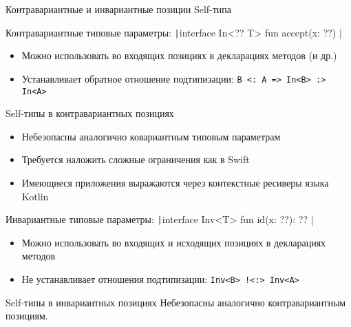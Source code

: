 \documentclass[handout,aspectratio=169,usenames,dvipsnames]{beamer}
\begin{document}
    \begin{frame}{Контравариантные и инвариантные позиции Self-типа}
        \begin{block}{Контравариантные типовые параметры: \texttt|interface In<?? T> { fun accept(x: ??) }|}
            \begin{itemize}
                \item Можно использовать во входящих позициях в декларациях методов (и др.)
                \item Устанавливает обратное отношение подтипизации: \texttt{B <: A => In<B> :> In<A>}
            \end{itemize}
        \end{block}
        \pause
        \begin{block}{Self-типы в контравариантных позициях}
            \begin{itemize}
                \item Небезопасны аналогично ковариантным типовым параметрам
                \item Требуется наложить сложные ограничения как в Swift
                \item Имеющиеся приложения выражаются через контекстные ресиверы языка Kotlin
            \end{itemize}
        \end{block}
        \pause
        \begin{block}{Инвариантные типовые параметры: \texttt|interface Inv<T> { fun id(x: ??): ?? }|}
            \begin{itemize}
                \item Можно использовать во входящих и исходящих позициях в декларациях методов
                \item Не устанавливает отношения подтипизации: \texttt{Inv<B> !<:> Inv<A>}
            \end{itemize}
        \end{block}
        \pause
        \begin{block}{Self-типы в инвариантных позициях}
            Небезопасны аналогично контравариантным позициям.
        \end{block}
    \end{frame}
\end{document}
